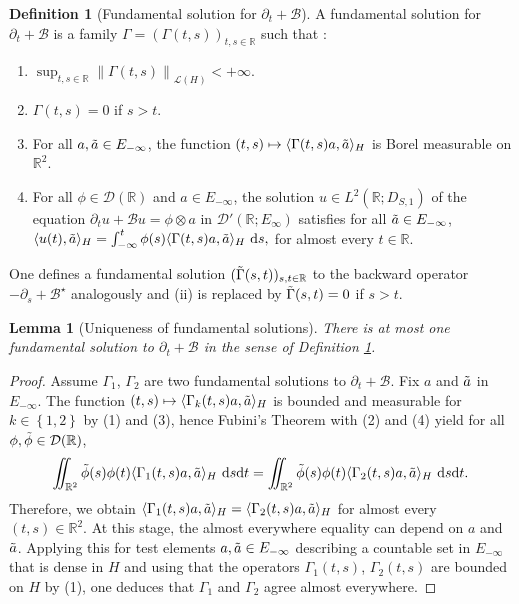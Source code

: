 \documentclass[11pt, letterpaper]{amsart}
\newtheorem{lem}[thm]{Lemma}
\theoremstyle{definition}
\newtheorem{defn}[thm]{Definition}
\theoremstyle{remark}
\numberwithin{equation}{section}
\begin{document}
\begin{defn}[Fundamental solution for $\partial_t + \mathcal{B}$] \label{FS}
    A fundamental solution for $\partial_t + \mathcal{B}$ is a family $\Gamma=(\Gamma(t,s))_{t,s \in \mathbb{R}}$ such that : 
    \begin{enumerate}
        \item $\sup_{t,s \in \mathbb{R}} \left\|\Gamma(t,s) \right\|_{\mathcal{L}(H)} < +\infty.$
        \item $\Gamma(t,s)=0$ if $s>t$.
        \item For all $a,\Tilde{a}\in E_{-\infty}$, the function $(t,s) \mapsto \langle \Gamma(t,s)a, \Tilde{a} \rangle_H$ is Borel measurable on $\mathbb{R}^2$.
        \item For all $\phi \in \mathcal{D}(\mathbb{R})$ and $a \in E_{-\infty}$, the solution $u \in L^2(\mathbb{R};D_{S,1})$ of the equation $\partial_t u + \mathcal{B}u = \phi \otimes a $ in $\mathcal{D}'(\mathbb{R};E_\infty)$ satisfies for  all $\Tilde{a} \in E_{-\infty}$,  $\langle u(t), \Tilde{a} \rangle_H = \int_{-\infty}^{t} \phi(s) \langle \Gamma (t,s)a, \Tilde{a} \rangle_H \ \mathrm{d}s,$ for almost every $t\in \mathbb{R}$.
    \end{enumerate}
    One defines a fundamental solution $(\Tilde{\Gamma}(s,t))_{s,t \in \mathbb{R}}$ to the backward operator $-\partial_s + \mathcal{B}^\star$ analogously and (ii) is replaced by $\Tilde{\Gamma}(s,t)=0$ if $s>t$.
\end{defn}
\begin{lem}[Uniqueness of fundamental solutions]\label{Unicité sol fonda} There is at most one fundamental solution to $\partial_t + \mathcal{B}$ in the sense of Definition \ref{FS}.
\end{lem}
\begin{proof}
     Assume $\Gamma_1$, $\Gamma_2$ are two fundamental solutions to $\partial_t + \mathcal{B}$. Fix $a$ and $\Tilde{a}$ in $E_{-\infty}$. The function $(t,s) \mapsto \langle \Gamma_k(t,s)a, \Tilde{a} \rangle_H$ is bounded and measurable for $k \in \left\{1,2 \right\}$ by (1) and (3), hence Fubini's Theorem with (2) and (4) yield  for all $\phi, \Tilde{\phi} \in \mathcal{D}(\mathbb{R})$,
\begin{equation*}
    \iint_{\mathbb{R}^2} \Tilde{\phi}(s) {\phi}(t) \langle \Gamma_1 (t,s)a, \Tilde{a} \rangle_H \ \mathrm{d}s\mathrm{d}t = \iint_{\mathbb{R}^2} \Tilde{\phi}(s) \phi(t) \langle \Gamma_2 (t,s)a, \Tilde{a} \rangle_H \ \mathrm{d}s\mathrm{d}t.
\end{equation*}
 Therefore, we obtain $\langle \Gamma_1 (t,s)a, \Tilde{a} \rangle_H = \langle \Gamma_2 (t,s)a, \Tilde{a} \rangle_H$ for almost every $(t,s) \in \mathbb{R}^2$. At this stage, the almost everywhere equality can depend on $a$ and $\Tilde{a}$. Applying this for test elements $a,\Tilde{a} \in E_{-\infty}$ describing a countable set in $E_{-\infty}$ that is dense in $H$ and using that the  operators $\Gamma_1(t,s)$, $\Gamma_2(t,s)$ are bounded on $H$ by (1), one deduces that $\Gamma_1$ and $\Gamma_2$ agree almost everywhere.
\end{proof}
\end{document}
